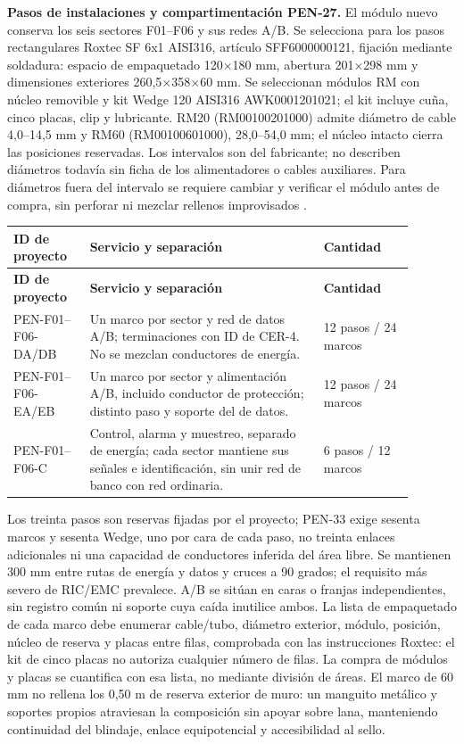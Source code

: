 \textbf{Pasos de instalaciones y compartimentación PEN-27.}\label{sec:sd4-pen27}
El módulo nuevo conserva los seis sectores F01--F06 y sus redes A/B. Se selecciona para los pasos rectangulares Roxtec SF 6x1 AISI316, artículo SFF6000000121, fijación mediante soldadura: espacio de empaquetado 120$\times$180 mm, abertura 201$\times$298 mm y dimensiones exteriores 260,5$\times$358$\times$60 mm. Se seleccionan módulos RM con núcleo removible y kit Wedge 120 AISI316 AWK0001201021; el kit incluye cuña, cinco placas, clip y lubricante. RM20 (RM00100201000) admite diámetro de cable 4,0--14,5 mm y RM60 (RM00100601000), 28,0--54,0 mm; el núcleo intacto cierra las posiciones reservadas. Los intervalos son del fabricante; no describen diámetros todavía sin ficha de los alimentadores o cables auxiliares. Para diámetros fuera del intervalo se requiere cambiar y verificar el módulo antes de compra, sin perforar ni mezclar rellenos improvisados \parencites{l27-roxtec-sf}[pp.~29--35, 46--48]{l27-roxtec-marine}.

\begin{longtable}{|p{0.17\linewidth}|p{0.52\linewidth}|p{0.20\linewidth}|}
\hline \textbf{ID de proyecto} & \textbf{Servicio y separación} & \textbf{Cantidad} \\\hline
\endfirsthead
\hline \textbf{ID de proyecto} & \textbf{Servicio y separación} & \textbf{Cantidad} \\\hline
\endhead
PEN-F01--F06-DA/DB & Un marco por sector y red de datos A/B; terminaciones con ID de CER-4. No se mezclan conductores de energía. & 12 pasos / 24 marcos \\\hline
PEN-F01--F06-EA/EB & Un marco por sector y alimentación A/B, incluido conductor de protección; distinto paso y soporte del de datos. & 12 pasos / 24 marcos \\\hline
PEN-F01--F06-C & Control, alarma y muestreo, separado de energía; cada sector mantiene sus señales e identificación, sin unir red de banco con red ordinaria. & 6 pasos / 12 marcos \\\hline
\end{longtable}

Los treinta pasos son reservas fijadas por el proyecto; PEN-33 exige sesenta marcos y sesenta Wedge, uno por cara de cada paso, no treinta enlaces adicionales ni una capacidad de conductores inferida del área libre. Se mantienen 300 mm entre rutas de energía y datos y cruces a 90 grados; el requisito más severo de RIC/EMC prevalece. A/B se sitúan en caras o franjas independientes, sin registro común ni soporte cuya caída inutilice ambos. La lista de empaquetado de cada marco debe enumerar cable/tubo, diámetro exterior, módulo, posición, núcleo de reserva y placas entre filas, comprobada con las instrucciones Roxtec: el kit de cinco placas no autoriza cualquier número de filas. La compra de módulos y placas se cuantifica con esa lista, no mediante división de áreas. El marco de 60 mm no rellena los 0,50 m de reserva exterior de muro: un manguito metálico y soportes propios atraviesan la composición sin apoyar sobre lana, manteniendo continuidad del blindaje, enlace equipotencial y accesibilidad al sello.

